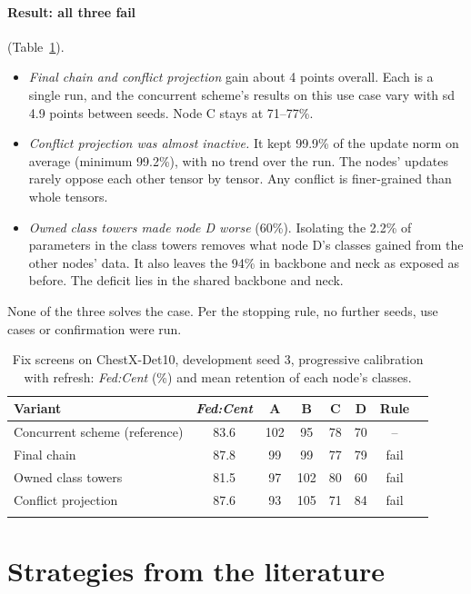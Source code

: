 \documentclass[pdflatex,sn-mathphys-num]{sn-jnl}
\newcommand{\fedcent}{\textit{Fed:Cent}}
\begin{document}
\paragraph{Result: all three fail} (Table~\ref{tab:s-gate}).
\begin{itemize}
\item \emph{Final chain and conflict projection} gain about 4 points overall. Each is a single run, and the concurrent scheme's results on this use case vary with sd 4.9 points between seeds. Node C stays at 71--77\%.
\item \emph{Conflict projection was almost inactive.} It kept 99.9\% of the update norm on average (minimum 99.2\%), with no trend over the run. The nodes' updates rarely oppose each other tensor by tensor. Any conflict is finer-grained than whole tensors.
\item \emph{Owned class towers made node D worse} (60\%). Isolating the 2.2\% of parameters in the class towers removes what node D's classes gained from the other nodes' data. It also leaves the 94\% in backbone and neck as exposed as before. The deficit lies in the shared backbone and neck.
\end{itemize}
None of the three solves the case. Per the stopping rule, no further seeds, use cases or confirmation were run.

\begin{table}[h]
\caption{Fix screens on ChestX-Det10, development seed 3, progressive calibration with refresh: \fedcent{} (\%) and mean retention of each node's classes.}\label{tab:s-gate}
\footnotesize
\begin{tabular*}{\textwidth}{@{\extracolsep\fill}lccccccc}
\toprule
Variant & \fedcent{} & A & B & C & D & Rule \\
\midrule
Concurrent scheme (reference) & 83.6 & 102 & 95 & 78 & 70 & -- \\
Final chain & 87.8 & 99 & 99 & 77 & 79 & fail \\
Owned class towers & 81.5 & 97 & 102 & 80 & 60 & fail \\
Conflict projection & 87.6 & 93 & 105 & 71 & 84 & fail \\
\botrule
\end{tabular*}
\end{table}

\section{Strategies from the literature}\label{sec:s-lit}
\end{document}

